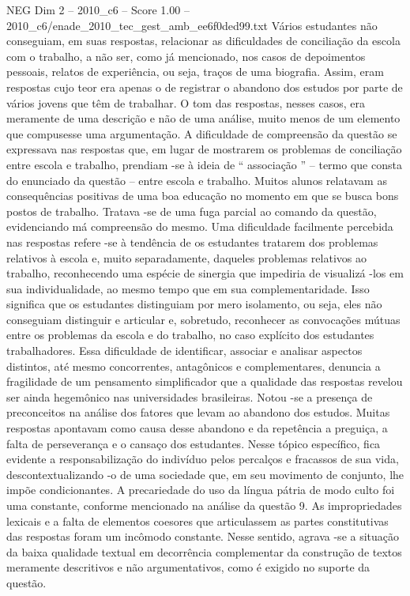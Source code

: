 \begin{textsample}{NEG Dim 2 – 2010\_c6 – Score 1.00 – 2010\_c6/enade\_2010\_tec\_gest\_amb\_ee6f0ded99.txt}
Vários estudantes não conseguiam, em suas respostas, relacionar as dificuldades de conciliação da escola com o trabalho, a não ser, como já mencionado, nos casos de depoimentos pessoais, relatos de experiência, ou seja, traços de uma biografia.
Assim, eram respostas cujo teor era apenas o de registrar o abandono dos estudos por parte de vários jovens que têm de trabalhar.
O tom das respostas, nesses casos, era meramente de uma descrição e não de uma análise, muito menos de um elemento que compusesse uma argumentação.
A dificuldade de compreensão da questão se expressava nas respostas que, em lugar de mostrarem os problemas de conciliação entre escola e trabalho, prendiam -se à ideia de “ associação ” – termo que consta do enunciado da questão – entre escola e trabalho.
Muitos alunos relatavam as consequências positivas de uma boa educação no momento em que se busca bons postos de trabalho.
Tratava -se de uma fuga parcial ao comando da questão, evidenciando má compreensão do mesmo.
Uma dificuldade facilmente percebida nas respostas refere -se à tendência de os estudantes tratarem dos problemas relativos à escola e, muito separadamente, daqueles problemas relativos ao trabalho, reconhecendo uma espécie de sinergia que impediria de visualizá -los em sua individualidade, ao mesmo tempo que em sua complementaridade.
Isso significa que os estudantes distinguiam por mero isolamento, ou seja, eles não conseguiam distinguir e articular e, sobretudo, reconhecer as convocações mútuas entre os problemas da escola e do trabalho, no caso explícito dos estudantes trabalhadores.
Essa dificuldade de identificar, associar e analisar aspectos distintos, até mesmo concorrentes, antagônicos e complementares, denuncia a fragilidade de um pensamento simplificador que a qualidade das respostas revelou ser ainda hegemônico nas universidades brasileiras.
Notou -se a presença de preconceitos na análise dos fatores que levam ao abandono dos estudos.
Muitas respostas apontavam como causa desse abandono e da repetência a preguiça, a falta de perseverança e o cansaço dos estudantes.
Nesse tópico específico, fica evidente a responsabilização do indivíduo pelos percalços e fracassos de sua vida, descontextualizando -o de uma sociedade que, em seu movimento de conjunto, lhe impõe condicionantes.
A precariedade do uso da língua pátria de modo culto foi uma constante, conforme mencionado na análise da questão 9.
As impropriedades lexicais e a falta de elementos coesores que articulassem as partes constitutivas das respostas foram um incômodo constante.
Nesse sentido, agrava -se a situação da baixa qualidade textual em decorrência complementar da construção de textos meramente descritivos e não argumentativos, como é exigido no suporte da questão.

\end{textsample}

